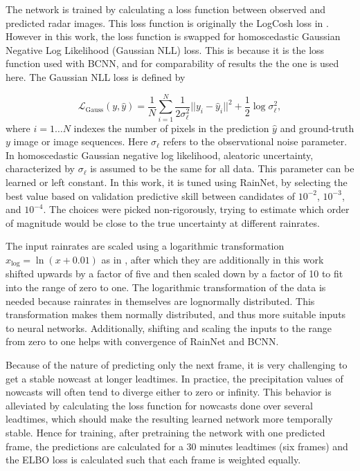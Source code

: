 The network is trained by calculating a loss function between observed and predicted radar images. This loss function is originally the LogCosh loss in \citet{ayzel_rainnet_nodate}. However in this work, the loss function is swapped for homoscedastic Gaussian Negative Log Likelihood (Gaussian NLL) loss. This is because it is the loss function used with BCNN, and for comparability of results the the one is used here. The Gaussian NLL loss \cite{kendall_what_2017} is defined by 

\begin{equation}
\mathcal{L}_\text{Gauss}(y, \hat{y}) = \frac{1}{N} \sum_{i=1}^{N} \frac{1}{2\sigma_\ell^2}||y_i - \hat{y}_i||^2 
+ \frac{1}{2} \log \sigma_\ell^2,
\end{equation}
%
where $i = 1 \dots N$ indexes the number of pixels in the prediction $\hat{y}$ and ground-truth $y$ image or image sequences. Here $\sigma_\ell$ refers to the observational noise parameter. In homoscedastic Gaussian negative log likelihood, aleatoric uncertainty, characterized by $\sigma_\ell$ is assumed to be the same for all data. This parameter can be learned or left constant. In this work, it is tuned using RainNet, by selecting the best value based on validation predictive skill between candidates of $10^{-2}$, $10^{-3}$, and $10^{-4}$. The choices were picked non-rigorously, trying to estimate which order of magnitude would be close to the true uncertainty at different rainrates.

The input rainrates are scaled using a logarithmic transformation $x_{\log} = \ln(x + 0.01)$ as in \citet{ayzel_rainnet_nodate}, after which they are additionally in this work shifted upwards by a factor of five and then scaled down by a factor of 10 to fit into the range of zero to one. The logarithmic transformation of the data is needed because rainrates in themselves are lognormally distributed. This transformation makes them normally distributed, and thus more suitable inputs to neural networks. Additionally, shifting and scaling the inputs to the range from zero to one helps with convergence of RainNet and BCNN. 

Because of the nature of predicting only the next frame, it is very challenging to get a stable nowcast at longer leadtimes. In practice, the precipitation values of nowcasts will often tend to diverge either to zero or infinity. This behavior is alleviated by calculating the loss function for nowcasts done over several leadtimes, which should make the resulting learned network more temporally stable. Hence for training, after pretraining the network with one predicted frame, the predictions are calculated for a 30 minutes leadtimes (six frames) and the ELBO loss is calculated such that each frame is weighted equally. 


